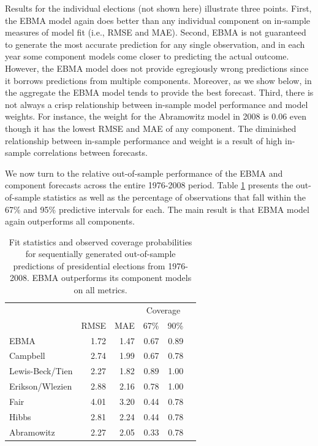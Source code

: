 \documentclass[pdftex,12pt,fullpage,oneside]{amsart}
\begin{document}
Results for the individual elections (not shown here) illustrate three
points.  First, the EBMA model again does better than any individual
component on in-sample measures of model fit (i.e., RMSE and MAE).
Second, EBMA is not guaranteed to generate the most accurate
prediction for any single observation, and in each year some component
models come closer to predicting the actual outcome.  However, the
EBMA model does not provide egregiously wrong predictions since it
borrows predictions from multiple components.  Moreover, as we show
below, in the aggregate the EBMA model tends to provide the best
forecast.  Third, there is not always a crisp relationship between
in-sample model performance and model weights.  For instance, the
weight for the Abramowitz model in 2008 is 0.06 even though it has the
lowest RMSE and MAE of any component.  The diminished relationship
between in-sample performance and weight is a result of high in-sample
correlations between forecasts.  %

We now turn to the relative out-of-sample performance of the EBMA and
component forecasts across the entire 1976-2008 period.  Table
\ref{Pres-Res} presents the out-of-sample statistics as well as the
percentage of observations that fall within the 67\% and 95\%
predictive intervals for each.  The main result is that EBMA model
again outperforms all components.

\begin{table}[ht!]
  \caption{\footnotesize Fit statistics and observed coverage
    probabilities for sequentially generated out-of-sample predictions of
    presidential elections from 1976-2008.  EBMA outperforms its
    component models on all metrics.}
\label{Pres-Res} \small
\begin{center}
\begin{tabular}{lrrrrr}
\toprule
                        &              &              & \multicolumn{2}{c}{Coverage} \\ 
                    	&	RMSE&	MAE	&67\% &   90\%      \\
\midrule
EBMA	           &	1.72	&	1.47	&	0.67	&	0.89	\\
Campbell	           &	2.74	&	1.99	&	0.67	&	0.78	\\
Lewis-Beck/Tien&	2.27	&	1.82	&	0.89	&	1.00	\\
Erikson/Wlezien&	2.88	&	2.16	&	0.78	&	1.00	\\
Fair	                   &	4.01	&	3.20	&	0.44	&	0.78	\\
Hibbs	           &	2.81	&	2.24	&	0.44&      0.78 \\
Abramowitz	   &	2.27	&	2.05	&	0.33	&     0.78	\\

\bottomrule
\end{tabular}
\end{center}
\end{table}
\end{document}
